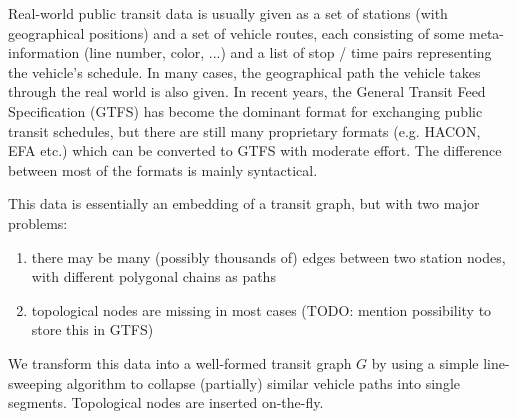 \documentclass{llncs}
\begin{document}
Real-world public transit data is usually given as a set of stations (with geographical positions) and a set of vehicle routes, each consisting of some meta-information (line number, color, ...) and a list of stop / time pairs representing the vehicle's schedule. In many cases, the geographical path the vehicle takes through the real world is also given. In recent years, the General Transit Feed Specification (GTFS) has become the dominant format for exchanging public transit schedules, but there are still many proprietary formats (e.g. HACON, EFA etc.) which can be converted to GTFS with moderate effort. The difference between most of the formats is mainly syntactical.

This data is essentially an embedding of a transit graph, but with two major problems:
\begin{enumerate}
\item there may be many (possibly thousands of) edges between two station nodes, with different polygonal chains as paths
\item topological nodes are missing in most cases (TODO: mention possibility to store this in GTFS)
\end{enumerate}

We transform this data into a well-formed transit graph $G$ by using a simple line-sweeping algorithm to collapse (partially) similar vehicle paths into single segments. Topological nodes are inserted on-the-fly.
\end{document}
